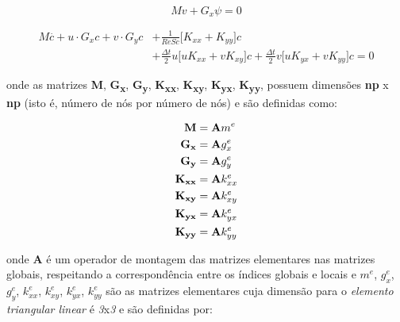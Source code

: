 \begin{equation}
 Mv + G_x \psi = 0
\end{equation}

\begin{equation}
\begin{aligned}
 M \overset{.}{c} + u \cdot G_x c + v \cdot G_y c & + \frac{1}{\textit{ReSc}} \Big[ K_{xx} + K_{yy} \Big] c
 \\[5pt]
 & + \frac{\Delta t}{2} u \Big[ u K_{xx} + v K_{xy} \Big] c
 + \frac{\Delta t}{2} v \Big[ u K_{yx} + v K_{yy} \Big] c 
 = 0 \label{concentration matrix}
\end{aligned} 
\end{equation}

\medskip
\noindent
onde as matrizes \textbf{M}, \textbf{G\textsubscript{x}}, 
\textbf{G\textsubscript{y}}, \textbf{K\textsubscript{xx}},
\textbf{K\textsubscript{xy}},
\textbf{K\textsubscript{yx}}, 
\textbf{K\textsubscript{yy}}, 
possuem dimensões \textbf{np} x \textbf{np}
(isto é, número de nós por número de nós) e
são definidas como:

\begin{align}
  \textbf{M} & = \textbf{A} m^{e}\\
  \textbf{G\textsubscript{x}} & = \textbf{A} g_{x}^{e}\\
  \textbf{G\textsubscript{y}} & = \textbf{A} g_{y}^{e} \\
  \textbf{K\textsubscript{xx}} & = \textbf{A} k_{xx}^{e} \\
  \textbf{K\textsubscript{xy}} & = \textbf{A} k_{xy}^{e} \\
  \textbf{K\textsubscript{yx}} & = \textbf{A} k_{yx}^{e} \\
  \textbf{K\textsubscript{yy}} & = \textbf{A} k_{yy}^{e}
\end{align}

\noindent
onde \textbf{A} é um operador de montagem das
matrizes elementares nas matrizes globais, 
respeitando a correspondência entre os índices
globais e locais e 
$m^{e}$, 
$g^{e}_{x}$,
$g^{e}_{y}$,
$k^{e}_{xx}$,
$k^{e}_{xy}$,
$k^{e}_{yx}$,
$k^{e}_{yy}$
são as matrizes elementares cuja dimensão para o 
\textit{elemento triangular linear} é \textit{3}x\textit{3} e 
são definidas por:


